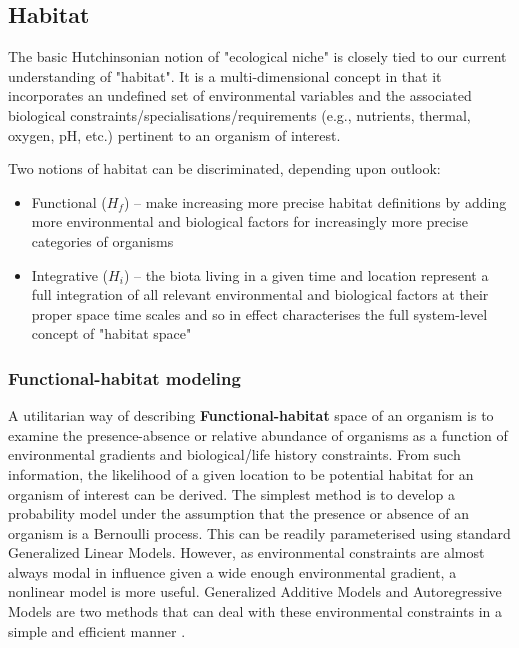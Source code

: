 \documentclass[letterpaper,portrait,11pt]{scrartcl}
\numberwithin{equation}{section}    %
\numberwithin{figure}{section}    %
\numberwithin{table}{section}       %
\begin{document}
\subsection{Habitat}

The basic Hutchinsonian notion of "ecological niche" is closely tied to our current understanding of "habitat". It is a multi-dimensional concept in that it incorporates an undefined set of  environmental variables and the associated biological constraints/specialisations/requirements (e.g., nutrients, thermal, oxygen, pH, etc.) pertinent to an organism of interest.

Two notions of habitat can be discriminated, depending upon outlook:

\begin{itemize}
  \item Functional ($H_f$) -- make increasing more precise habitat definitions by adding more environmental and biological factors for increasingly more precise categories of organisms
  \item Integrative ($H_i$) -- the biota living in a given time and location represent a full integration of all relevant environmental and biological factors at their proper space time scales and so in effect characterises the full system-level concept of "habitat space"
\end{itemize}


\subsubsection{Functional-habitat modeling}
\label{sec:habitatSpecies}

A utilitarian way of describing \textbf{Functional-habitat} space of an organism is to examine the presence-absence or relative abundance of organisms as a function of environmental gradients and biological/life history constraints. From such information, the likelihood of a given location to be potential habitat for an organism of interest can be derived. The simplest method is to develop a probability model under the assumption that the presence or absence of an organism is a Bernoulli process. This can be readily parameterised using standard Generalized Linear Models. However, as environmental constraints are almost always modal in influence given a wide enough environmental gradient, a nonlinear model is more useful. Generalized Additive Models and Autoregressive Models are two methods that can deal with these environmental constraints in a simple and efficient manner \parencite{choi:2010}.
\end{document}
